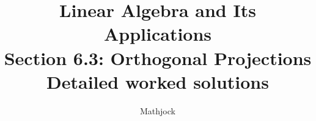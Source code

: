 
\title{\textbf{Linear Algebra and Its Applications}\\[0.3em]Section 6.3: Orthogonal Projections\\[0.3em]\large Detailed worked solutions}
\author{Mathjock}
\date{}

\maketitle
\bookinfo
\tableofcontents
\clearpage
\renewcommand{\thesection}{6.\arabic{section}}
\renewcommand{\theHsection}{6.\arabic{section}}
\setcounter{section}{2}


